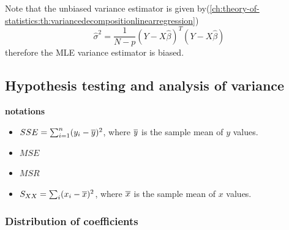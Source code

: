 \begin{refsection}
\begin{remark}
Note that the unbiased variance estimator is given by(\autoref{ch:theory-of-statistics:th:variancedecompositionlinearregression})
$$\hat{\sigma}^2 = \frac{1}{N-p}(Y-X\hat{\beta})^T(Y-X\hat{\beta})$$
therefore the MLE variance estimator is biased.
\end{remark}

\subsection{Hypothesis testing and analysis of variance}
\begin{mdframed}
	\textbf{notations}
	\begin{itemize}
		\item $SSE = \sum_{i=1}^n (y_i - \overline{y})^2$, where $\overline{y}$ is the sample mean of $y$ values.
		\item $MSE$
		\item $MSR$
		\item $S_{XX} = \sum_i (x_{i}-\overline{x})^2$, where $\overline{x}$ is the sample mean of $x$ values.
	\end{itemize}
\end{mdframed}

\subsubsection{Distribution of coefficients}


\end{refsection}

